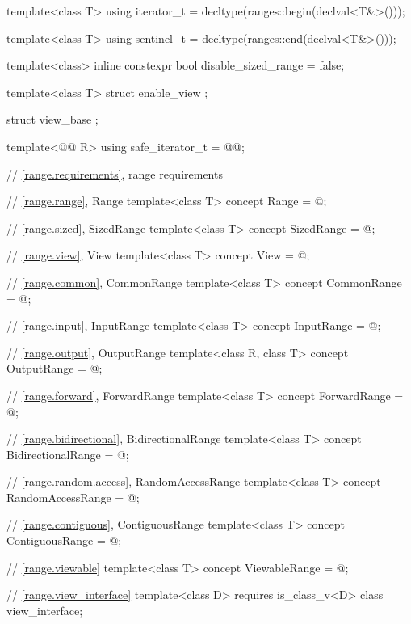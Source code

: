 \begin{addedblock}
\begin{codeblock}
{{    template<class T>
      using iterator_t = decltype(ranges::begin(declval<T&>()));

    template<class T>
      using sentinel_t = decltype(ranges::end(declval<T&>()));

    template<class>
      inline constexpr bool disable_sized_range = false;

    template<class T>
    struct enable_view { };

    struct view_base { };

    template<@@ R>
      using safe_iterator_t = @@;

    // \ref{range.requirements}, range requirements

    // \ref{range.range}, Range
    template<class T>
      concept Range = @\seebelownc@;

    // \ref{range.sized}, SizedRange
    template<class T>
      concept SizedRange = @\seebelownc@;

    // \ref{range.view}, View
    template<class T>
      concept View = @\seebelownc@;

    // \ref{range.common}, CommonRange
    template<class T>
      concept CommonRange = @\seebelownc@;

    // \ref{range.input}, InputRange
    template<class T>
      concept InputRange = @\seebelownc@;

    // \ref{range.output}, OutputRange
    template<class R, class T>
      concept OutputRange = @\seebelownc@;

    // \ref{range.forward}, ForwardRange
    template<class T>
      concept ForwardRange = @\seebelownc@;

    // \ref{range.bidirectional}, BidirectionalRange
    template<class T>
      concept BidirectionalRange = @\seebelownc@;

    // \ref{range.random.access}, RandomAccessRange
    template<class T>
      concept RandomAccessRange = @\seebelownc@;

    // \ref{range.contiguous}, ContiguousRange
    template<class T>
      concept ContiguousRange = @\seebelownc@;

    // \ref{range.viewable}
    template<class T>
      concept ViewableRange = @\seebelownc@;

    // \ref{range.view_interface}
    template<class D>
      requires is_class_v<D>
    class view_interface;

}}
\end{codeblock}
\end{addedblock}
